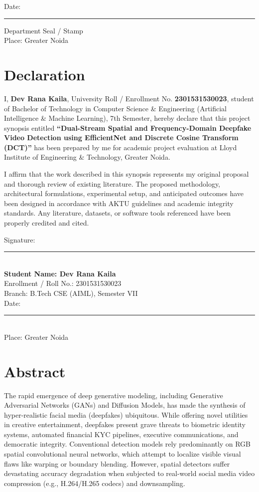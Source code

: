 \documentclass[12pt,a4paper]{report}
\begin{document}
\vspace{2.0cm}
\noindent
Date: \rule{4cm}{0.4pt} \hfill Department Seal / Stamp\\
Place: Greater Noida

\newpage

\chapter*{Declaration}
\thispagestyle{plain}

I, \textbf{Dev Rana Kaila}, University Roll / Enrollment No. \textbf{2301531530023}, student of Bachelor of Technology in Computer Science \& Engineering (Artificial Intelligence \& Machine Learning), 7th Semester, hereby declare that this project synopsis entitled \textbf{“Dual-Stream Spatial and Frequency-Domain Deepfake Video Detection using EfficientNet and Discrete Cosine Transform (DCT)”} has been prepared by me for academic project evaluation at Lloyd Institute of Engineering \& Technology, Greater Noida.

\vspace{0.5cm}
I affirm that the work described in this synopsis represents my original proposal and thorough review of existing literature. The proposed methodology, architectural formulations, experimental setup, and anticipated outcomes have been designed in accordance with AKTU guidelines and academic integrity standards. Any literature, datasets, or software tools referenced have been properly credited and cited.

\vspace{4.0cm}
\noindent
Signature: \rule{6cm}{0.4pt}\\[0.4cm]
\textbf{Student Name: Dev Rana Kaila}\\
Enrollment / Roll No.: 2301531530023\\
Branch: B.Tech CSE (AIML), Semester VII\\
Date: \rule{4cm}{0.4pt}\\
Place: Greater Noida

\newpage

\chapter*{Abstract}
\thispagestyle{plain}

The rapid emergence of deep generative modeling, including Generative Adversarial Networks (GANs) and Diffusion Models, has made the synthesis of hyper-realistic facial media (deepfakes) ubiquitous. While offering novel utilities in creative entertainment, deepfakes present grave threats to biometric identity systems, automated financial KYC pipelines, executive communications, and democratic integrity. Conventional detection models rely predominantly on RGB spatial convolutional neural networks, which attempt to localize visible visual flaws like warping or boundary blending. However, spatial detectors suffer devastating accuracy degradation when subjected to real-world social media video compression (e.g., H.264/H.265 codecs) and downsampling.
\end{document}
